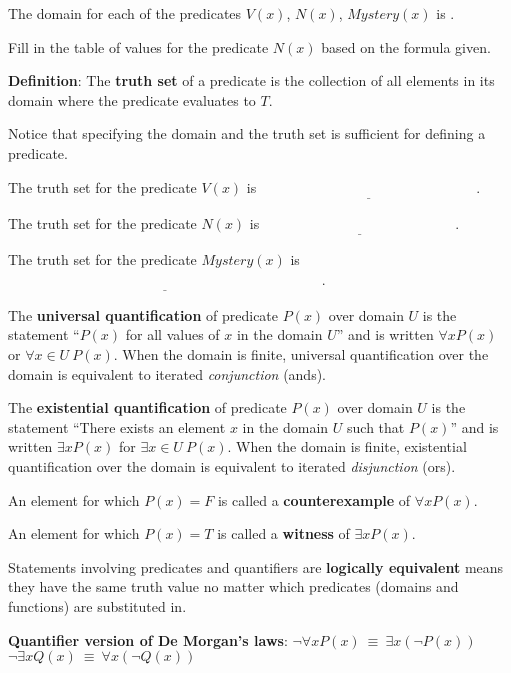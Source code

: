 \documentclass[12pt, oneside]{article}
\begin{document}
    The domain for each of the predicates $V(x)$, $N(x)$, $Mystery(x)$ is
    \underline{}.

    Fill in the table of values for the predicate $N(x)$ based on the formula given. \vfill


{\bf Definition}: The {\bf truth  set} of a  predicate is the collection of all elements in its
domain where the predicate evaluates to $T$.

Notice that specifying the domain and the truth set is sufficient for defining
a predicate. 

The truth set for the predicate $V(x)$ is $\underline{\phantom{\{ x ~\mid~ V(x) = T\} = \{ 001, 010, 011 \}}}$.

The truth set for the predicate $N(x)$ is $\underline{\phantom{\{ x ~\mid~ N(x) = T\} = \{ 101, 111 \}}}$.

The truth set for the predicate $Mystery(x)$ is $\underline{\phantom{\{ x ~\mid~ Mystery(x) = T\} = \{ 000, 001, 010, 101, 111 \}}}$.


\vfill \newpage


The {\bf universal quantification} of predicate $P(x)$ over
domain $U$ is the statement ``$P(x)$ for all values of $x$ in the domain $U$''
and is written $\forall x P(x)$ or $\forall x \in U ~P(x)$. 
When the domain is finite, universal quantification over the domain 
is equivalent to iterated {\it conjunction} (ands).

The {\bf existential quantification} of predicate $P(x)$ 
over domain $U$ is the statement ``There exists an element $x$ 
in the domain $U$ such that $P(x)$'' and is written $\exists x P(x)$
for $\exists x \in U ~P(x)$. 
When the domain is finite, existential quantification over the domain 
is equivalent to iterated {\it disjunction} (ors).

An element for which $P(x) = F$ is called a {\bf counterexample} of $\forall x P(x)$.

An element for which $P(x) = T$ is called a {\bf witness} of $\exists x P(x)$.
 \vfill


Statements involving predicates and quantifiers are {\bf logically equivalent} 
means they have the same truth value no matter which predicates (domains and functions) 
are substituted in. 

{\bf Quantifier version of De Morgan's laws}: 
$\boxed{\neg \forall x P(x) ~\equiv~ \exists x \left( \neg P(x) \right)}$
\qquad
\qquad
$\boxed{\neg \exists x Q(x) ~\equiv~ \forall x \left( \neg Q(x) \right)}$
 \vfill
\end{document}
